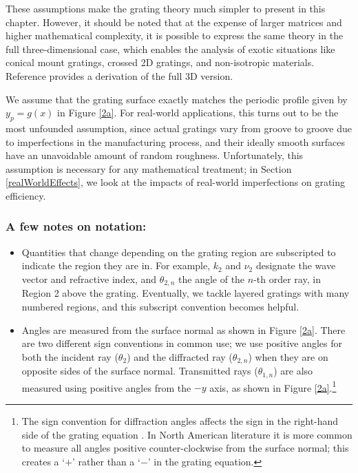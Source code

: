 These assumptions make the grating theory much simpler to present in this chapter. However, it should be noted that at the expense of larger matrices and higher mathematical complexity, it is possible to express the same theory in the full three-dimensional case, which enables the analysis of exotic situations like conical mount gratings, crossed 2D gratings, and non-isotropic materials.  Reference \cite[Chapter 5]{Nev02} provides a derivation of the full 3D version.

We assume that the grating surface exactly matches the periodic profile given by $y_p=g(x)$ in Figure \ref{2a}.  For real-world applications, this turns out to be the most unfounded assumption, since actual gratings vary from groove to groove due to imperfections in the manufacturing process, and their ideally smooth surfaces have an unavoidable amount of random roughness.  Unfortunately, this assumption is necessary for any mathematical treatment; in Section \ref{realWorldEffects}, we look at the impacts of real-world  imperfections on grating efficiency.

\subsubsection{A few notes on notation:}
\begin{itemize}
\item Quantities that change depending on the grating region are subscripted to indicate the region they are in.  For example, $k_2$ and $\nu_2$ designate the wave vector and refractive index, and $\theta_{2,n}$ the angle of the $n$-th order ray, in Region 2 above the grating.  Eventually, we tackle layered gratings with many numbered regions, and this subscript convention becomes helpful.
\item Angles are measured from the surface normal as shown in Figure \ref{2a}.  There are two different sign conventions in common use; we use positive angles for both the incident ray ($\theta_2$) and the diffracted ray ($\theta_{2,n}$) when they are on opposite sides of the surface normal.  Transmitted rays ($\theta_{1,n}$) are also measured using positive angles from the $-y$ axis, as shown in Figure \ref{2a}.\footnote{The sign convention for diffraction angles affects the sign in the right-hand side of the grating equation .  In North American literature it is more common to measure all angles positive counter-clockwise from the surface normal; this creates a `$+$' rather than a `$-$' in the grating equation.}
\end{itemize}


